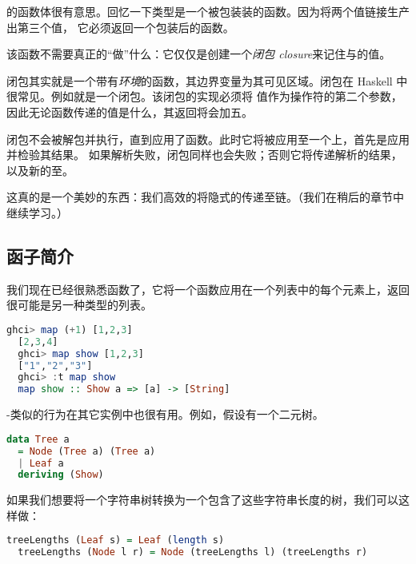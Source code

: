 \documentclass[./main.tex]{subfiles}
\begin{document}
\acode{(==>)}的函数体很有意思。回忆一下类型是一个被包装装的函数。因为\acode{(==>)}将两个值链接生产出第三个值，
它必须返回一个包装后的函数。

该函数不需要真正的“做”什么：它仅仅是创建一个\textit{闭包 closure}来记住与的值。

\begin{anote}
  闭包其实就是一个带有\textit{环境}的函数，其边界变量为其可见区域。闭包在 Haskell 中很常见。例如就是一个闭包。该闭包的实现必须将
  值作为操作符\acode{(+)}的第二个参数，因此无论函数传递的值是什么，其返回将会加五。
\end{anote}

闭包不会被解包并执行，直到应用了函数。此时它将被应用至一个上，首先是应用并检验其结果。
如果解析失败，闭包同样也会失败；否则它将传递解析的结果，以及新的至。

这真的是一个美妙的东西：我们高效的将隐式的传递至链。（我们在稍后的章节中继续学习。）

\subsection*{函子简介}

我们现在已经很熟悉函数了，它将一个函数应用在一个列表中的每个元素上，返回很可能是另一种类型的列表。

\begin{lstlisting}[language=Haskell]
  ghci> map (+1) [1,2,3]
  [2,3,4]
  ghci> map show [1,2,3]
  ["1","2","3"]
  ghci> :t map show
  map show :: Show a => [a] -> [String]
\end{lstlisting}

-类似的行为在其它实例中也很有用。例如，假设有一个二元树。

\begin{lstlisting}[language=Haskell]
  data Tree a
  = Node (Tree a) (Tree a)
  | Leaf a
  deriving (Show)
\end{lstlisting}

如果我们想要将一个字符串树转换为一个包含了这些字符串长度的树，我们可以这样做：

\begin{lstlisting}[language=Haskell]
  treeLengths (Leaf s) = Leaf (length s)
  treeLengths (Node l r) = Node (treeLengths l) (treeLengths r)
\end{lstlisting}
\end{document}
